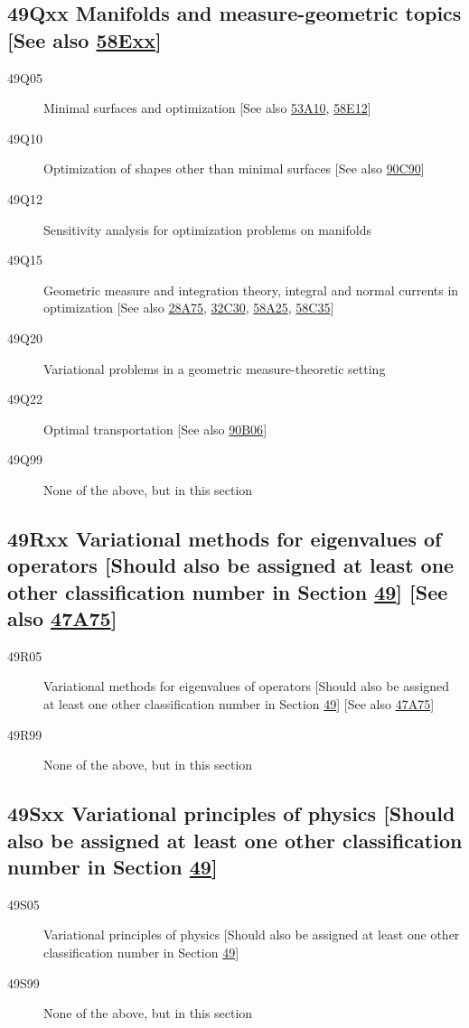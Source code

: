 \documentclass[letterpaper]{article}
\begin{document}
\subsection*{49Qxx Manifolds and measure-geometric topics [See also \hyperref[58Exx]{58Exx}]}\label{49Qxx}
\begin{description}
\item [49Q05]\label{49Q05} Minimal surfaces and optimization [See also \hyperref[53A10]{53A10}, \hyperref[58E12]{58E12}]
\item [49Q10]\label{49Q10} Optimization of shapes other than minimal surfaces [See also \hyperref[90C90]{90C90}]
\item [49Q12]\label{49Q12} Sensitivity analysis for optimization problems on manifolds
\item [49Q15]\label{49Q15} Geometric measure and integration theory, integral and normal currents in optimization [See also \hyperref[28A75]{28A75}, \hyperref[32C30]{32C30}, \hyperref[58A25]{58A25}, \hyperref[58C35]{58C35}]
\item [49Q20]\label{49Q20} Variational problems in a geometric measure-theoretic setting
\item [49Q22]\label{49Q22} Optimal transportation [See also \hyperref[90B06]{90B06}]
\item [49Q99]\label{49Q99} None of the above, but in this section
\end{description}
\subsection*{49Rxx  Variational methods for eigenvalues of operators [Should also be assigned at least one other classification number in Section \hyperref[49-XX]{49}] [See also \hyperref[47A75]{47A75}] }\label{49Rxx}
\begin{description}  
\item [49R05]\label{49R05} Variational methods for eigenvalues of operators [Should also be assigned at least one other classification number in Section \hyperref[49-XX]{49}] [See also \hyperref[47A75]{47A75}]
\item [49R99]\label{49R99} None of the above, but in this section
\end{description}
\subsection*{49Sxx  Variational principles of physics [Should also be assigned at least one other classification number in Section \hyperref[49-XX]{49}] }\label{49Sxx}
\begin{description}  
\item [49S05]\label{49S05} Variational principles of physics [Should also be assigned at least one other classification number in Section \hyperref[49-XX]{49}]
\item [49S99]\label{49S99} None of the above, but in this section
\end{description}
\end{document}

